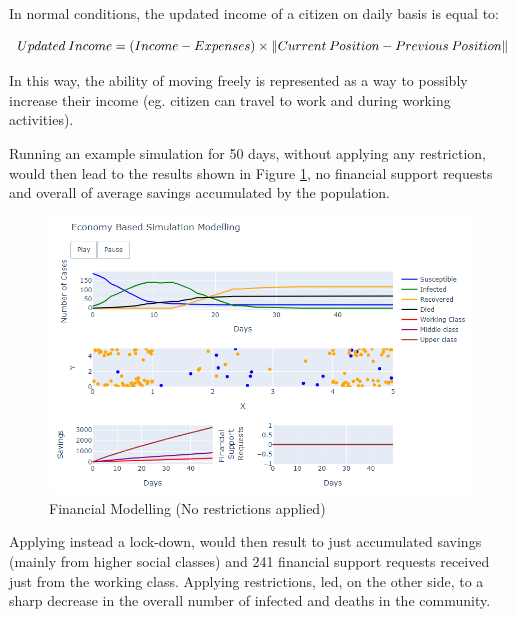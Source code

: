In normal conditions, the updated income of a citizen on daily basis is equal to:

\useshortskip
\begin{align}
\ Updated\:Income = (Income-Expenses)\times \norm{Current\:Position-Previous\:Position}
\label{euc}
\end{align}
\useshortskip

In this way, the ability of moving freely is represented as a way to possibly increase their income (eg. citizen can travel to work and during working activities).

Running an example simulation for 50 days, without applying any restriction, would then lead to the results shown in Figure \ref{fin1}, no financial support requests and overall  of average savings accumulated by the population.

\begin{figure}[ht!]%
    \centering
    \includegraphics[width=13cm]{latex/images/fin1.PNG}%
    \caption{Financial Modelling (No restrictions applied)}
    \label{fin1}
\end{figure}

Applying instead a lock-down, would then result to just 
accumulated savings (mainly from higher social classes) and 241 financial support requests received just from the working class. Applying restrictions, led, on the other side, to a sharp decrease in the overall number of infected and deaths in the community.

